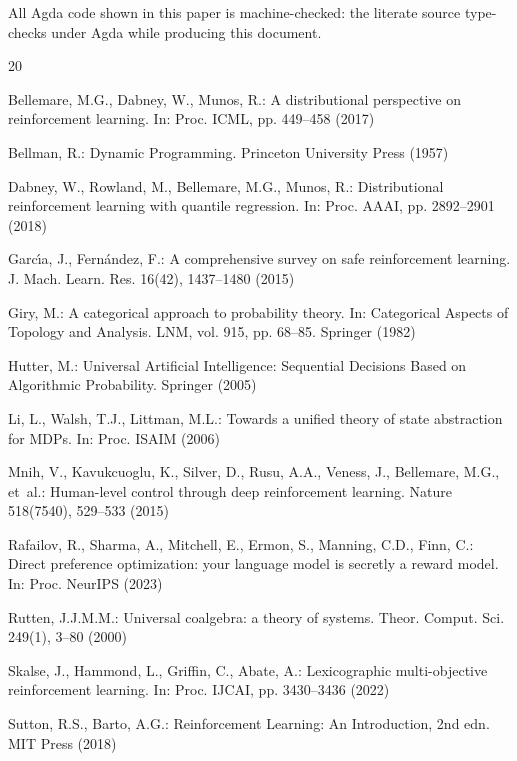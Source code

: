 \documentclass[runningheads]{llncs}
\begin{document}
\noindent All Agda code shown in this paper is machine-checked: the literate source type-checks under Agda while producing this document.

\begin{thebibliography}{20}

Bellemare, M.G., Dabney, W., Munos, R.: A distributional perspective on reinforcement learning. In: Proc. ICML, pp. 449--458 (2017)

Bellman, R.: Dynamic Programming. Princeton University Press (1957)

Dabney, W., Rowland, M., Bellemare, M.G., Munos, R.: Distributional reinforcement learning with quantile regression. In: Proc. AAAI, pp. 2892--2901 (2018)

Garc{\'\i}a, J., Fern{\'a}ndez, F.: A comprehensive survey on safe reinforcement learning. J. Mach. Learn. Res. 16(42), 1437--1480 (2015)

Giry, M.: A categorical approach to probability theory. In: Categorical Aspects of Topology and Analysis. LNM, vol. 915, pp. 68--85. Springer (1982)

Hutter, M.: Universal Artificial Intelligence: Sequential Decisions Based on Algorithmic Probability. Springer (2005)

Li, L., Walsh, T.J., Littman, M.L.: Towards a unified theory of state abstraction for MDPs. In: Proc. ISAIM (2006)

Mnih, V., Kavukcuoglu, K., Silver, D., Rusu, A.A., Veness, J., Bellemare, M.G., et~al.: Human-level control through deep reinforcement learning. Nature 518(7540), 529--533 (2015)

Rafailov, R., Sharma, A., Mitchell, E., Ermon, S., Manning, C.D., Finn, C.: Direct preference optimization: your language model is secretly a reward model. In: Proc. NeurIPS (2023)

Rutten, J.J.M.M.: Universal coalgebra: a theory of systems. Theor. Comput. Sci. 249(1), 3--80 (2000)

Skalse, J., Hammond, L., Griffin, C., Abate, A.: Lexicographic multi-objective reinforcement learning. In: Proc. IJCAI, pp. 3430--3436 (2022)

Sutton, R.S., Barto, A.G.: Reinforcement Learning: An Introduction, 2nd edn. MIT Press (2018)


\end{thebibliography}
\end{document}
